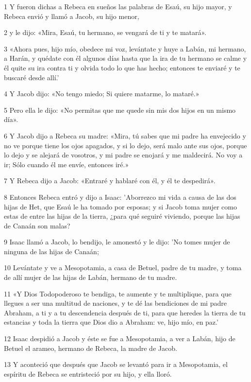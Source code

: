 \par 1 Y fueron dichas a Rebeca en sueños las palabras de Esaú, su hijo mayor, y Rebeca envió y llamó a Jacob, su hijo menor,
\par 2 y le dijo: «Mira, Esaú, tu hermano, se vengará de ti y te matará».
\par 3 «Ahora pues, hijo mío, obedece mi voz, levántate y huye a Labán, mi hermano, a Harán, y quédate con él algunos días hasta que la ira de tu hermano se calme y él quite su ira contra ti y olvida todo lo que has hecho; entonces te enviaré y te buscaré desde allí.'
\par 4 Y Jacob dijo: «No tengo miedo; Si quiere matarme, lo mataré.»
\par 5 Pero ella le dijo: «No permitas que me quede sin mis dos hijos en un mismo día».
\par 6 Y Jacob dijo a Rebeca su madre: «Mira, tú sabes que mi padre ha envejecido y no ve porque tiene los ojos apagados, y si lo dejo, será malo ante sus ojos, porque lo dejo y se alejará de vosotros, y mi padre se enojará y me maldecirá. No voy a ir; Sólo cuando él me envíe, entonces iré.»
\par 7 Y Rebeca dijo a Jacob: «Entraré y hablaré con él, y él te despedirá».
\par 8 Entonces Rebeca entró y dijo a Isaac: 'Aborrezco mi vida a causa de las dos hijas de Het, que Esaú le ha tomado por esposas; y si Jacob toma mujer como estas de entre las hijas de la tierra, ¿para qué seguiré viviendo, porque las hijas de Canaán son malas?
\par 9 Isaac llamó a Jacob, lo bendijo, le amonestó y le dijo: 'No tomes mujer de ninguna de las hijas de Canaán;
\par 10 Levántate y ve a Mesopotamia, a casa de Betuel, padre de tu madre, y toma de allí mujer de las hijas de Labán, hermano de tu madre.
\par 11 «Y Dios Todopoderoso te bendiga, te aumente y te multiplique, para que llegues a ser una multitud de naciones, y te dé las bendiciones de mi padre Abraham, a ti y a tu descendencia después de ti, para que heredes la tierra de tu estancias y toda la tierra que Dios dio a Abraham: ve, hijo mío, en paz.'
\par 12 Isaac despidió a Jacob y éste se fue a Mesopotamia, a ver a Labán, hijo de Betuel el arameo, hermano de Rebeca, la madre de Jacob.
\par 13 Y aconteció que después que Jacob se levantó para ir a Mesopotamia, el espíritu de Rebeca se entristeció por su hijo, y ella lloró.
